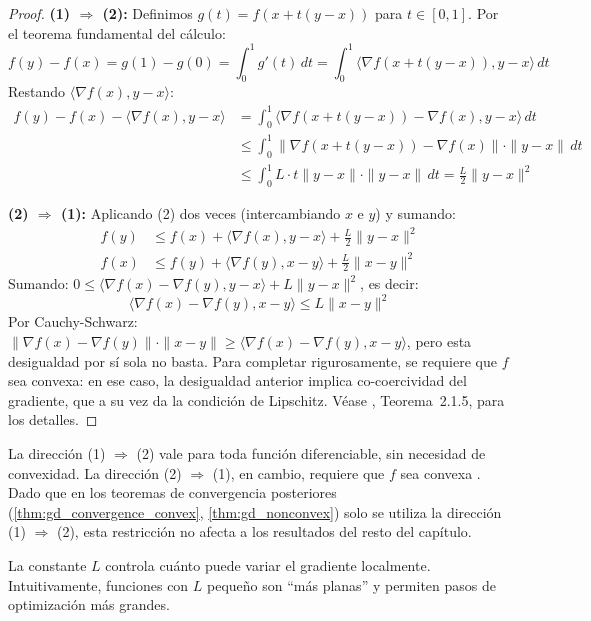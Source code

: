 \begin{proof}
	\textbf{(1) \(\Rightarrow\) (2):} Definimos \(g(t) = f(x + t(y-x))\) para \(t \in [0,1]\). Por el teorema fundamental del cálculo:
	\[
		f(y) - f(x) = g(1) - g(0) = \int_0^1 g'(t) \, dt = \int_0^1 \langle \nabla f(x + t(y-x)), y-x \rangle \, dt
	\]
	Restando \(\langle \nabla f(x), y-x \rangle\):
	\begin{align*}
		f(y) - f(x) - \langle \nabla f(x), y-x \rangle &= \int_0^1 \langle \nabla f(x + t(y-x)) - \nabla f(x), y-x \rangle \, dt \\
		&\leq \int_0^1 \|\nabla f(x + t(y-x)) - \nabla f(x)\| \cdot \|y-x\| \, dt \\
		&\leq \int_0^1 L \cdot t\|y-x\| \cdot \|y-x\| \, dt = \frac{L}{2}\|y-x\|^2
	\end{align*}

	\textbf{(2) \(\Rightarrow\) (1):} Aplicando (2) dos veces (intercambiando \(x\) e \(y\)) y sumando:
	\begin{align*}
		f(y) &\leq f(x) + \langle \nabla f(x), y-x \rangle + \frac{L}{2}\|y-x\|^2 \\
		f(x) &\leq f(y) + \langle \nabla f(y), x-y \rangle + \frac{L}{2}\|x-y\|^2
	\end{align*}
	Sumando: \(0 \leq \langle \nabla f(x) - \nabla f(y), y-x \rangle + L\|y-x\|^2\), es decir:
	\[
		\langle \nabla f(x) - \nabla f(y), x-y \rangle \leq L\|x-y\|^2
	\]
	Por Cauchy-Schwarz: \(\|\nabla f(x) - \nabla f(y)\| \cdot \|x-y\| \geq \langle \nabla f(x) - \nabla f(y), x-y \rangle\), pero esta desigualdad por sí sola no basta. Para completar rigurosamente, se requiere que \(f\) sea convexa: en ese caso, la desigualdad anterior implica co-coercividad del gradiente, que a su vez da la condición de Lipschitz. Véase \citet{Nesterov2018}, Teorema~2.1.5, para los detalles.
\end{proof}

\begin{remark}
	La dirección (1) \(\Rightarrow\) (2) vale para toda función diferenciable, sin necesidad de convexidad. La dirección (2) \(\Rightarrow\) (1), en cambio, requiere que \(f\) sea convexa \citep[Teorema~2.1.5]{Nesterov2018}. Dado que en los teoremas de convergencia posteriores (\autoref{thm:gd_convergence_convex}, \autoref{thm:gd_nonconvex}) solo se utiliza la dirección (1) \(\Rightarrow\) (2), esta restricción no afecta a los resultados del resto del capítulo.
\end{remark}

La constante \(L\) controla cuánto puede variar el gradiente localmente. Intuitivamente, funciones con \(L\) pequeño son ``más planas'' y permiten pasos de optimización más grandes.

